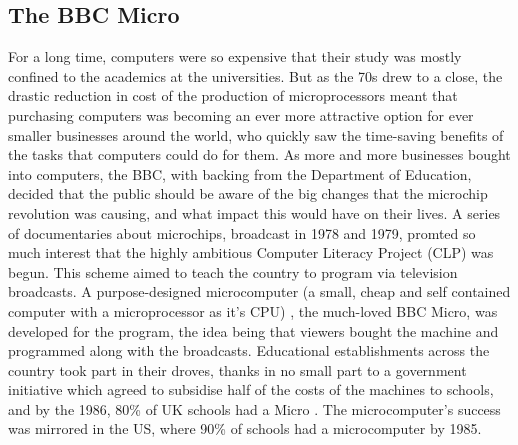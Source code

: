 \documentclass[ %
                    author={Jonathan Rankin},
                supervisor={Dr. David May, Dr. Ian Holyer},
                    degree={MEng},
                     title={CodeTouch},
                  subtitle={A Revolutionary Way To Program Real Code On Touch Screen Devices},
                      type={enterprise},
                      year={2015 } ]{dissertation}
\begin{document}
\subsection{The BBC Micro}

For a long time, computers were so expensive that their study was mostly confined to the academics at the universities. But as the 70s drew to a close, the drastic reduction in cost of the production of microprocessors meant that purchasing computers was becoming an ever more attractive option for ever smaller businesses around the world, who quickly saw the time-saving benefits of the tasks that computers could do for them. As more and more businesses bought into computers, the BBC, with backing from the Department of Education, decided that the public should be aware of the big changes that the microchip revolution was causing, and what impact this would have on their lives. A series of documentaries about microchips, broadcast in 1978 and 1979, promted so much interest that the highly ambitious Computer Literacy Project (CLP) was begun. This scheme aimed to teach the country to program via television broadcasts. A purpose-designed microcomputer (a small, cheap and self contained computer with a microprocessor as it's CPU) , the much-loved BBC Micro, was developed for the program, the idea being that viewers bought the machine and programmed along with the broadcasts. Educational establishments across the country took part in their droves, thanks in no small part to a government initiative which agreed to subsidise half of the costs of the machines to schools, and by the 1986, 80\% of UK schools had a Micro \cite{IIfASA}. The microcomputer's success was mirrored in the US, where 90\% of schools had a microcomputer by 1985\cite{IIfASA}.
\end{document}
